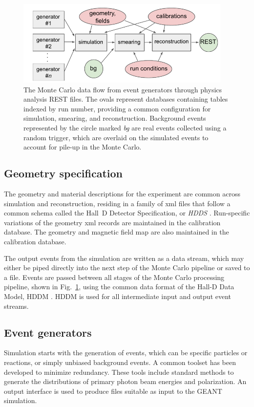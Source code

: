 \begin{figure}[t]\centering  
\includegraphics[width=0.95\textwidth]{figures/MonteCarlo_flow.pdf}
\caption[]{\label{fig:MC-data-flow}The Monte Carlo data flow from event generators through physics analysis REST files. The ovals represent databases containing tables indexed by run number, providing a common configuration for simulation, smearing, and reconstruction. Background events represented by the circle marked \emph{bg} are real events collected using a random trigger, which are overlaid on the simulated events to account for pile-up in the Monte Carlo.}
\end{figure}

\subsection[Geometry specification]{\label{sec:materialscan}Geometry specification}
The geometry and material descriptions for the experiment are common across simulation and reconstruction, residing in a family of xml files that follow a common schema called the Hall~D Detector Specification, or \emph{HDDS} \cite{HDDS,gx732}. Run-specific variations of the geometry xml records are maintained in the calibration database. The geometry and magnetic field map are also maintained in the calibration database.

The output events from the simulation are written as a data stream, which may either be piped directly into the next step of the Monte Carlo pipeline or saved to a file. Events are passed between 
all stages of the Monte Carlo processing pipeline, shown in Fig.~\ref{fig:MC-data-flow}, using the common data format of the Hall-D Data Model, HDDM \cite{gx65}. HDDM is used for all intermediate input and output event streams.

\subsection{Event generators \label{sec:generators}}
Simulation starts with the generation of events, which can be specific particles or reactions, or simply unbiased background events. A common toolset has been developed to minimize redundancy. These tools include standard methods to generate the distributions of primary photon beam energies and polarization. An output interface is used to produce files suitable as input to the GEANT simulation.


